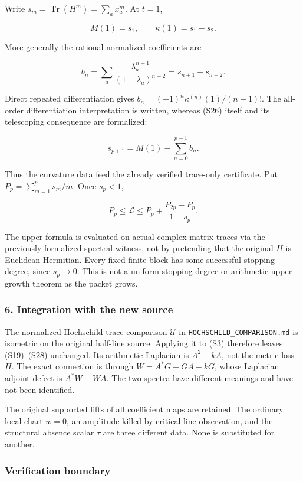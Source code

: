 Write \(s_m=\operatorname{Tr}(H^m)=\sum_a x_a^m\). At \(t=1\),

\[
M(1)=s_1,\qquad \kappa(1)=s_1-s_2.
\tag{S25}
\]

More generally the rational normalized coefficients are

\[
b_n=\sum_a\frac{\lambda_a^{n+1}}{(1+\lambda_a)^{n+2}}
=s_{n+1}-s_{n+2}.
\tag{S26}
\]

Direct repeated differentiation gives \(b_n=(-1)^n\kappa^{(n)}(1)/(n+1)!\). The all-order differentiation interpretation is written, whereas (S26) itself and its telescoping consequence are formalized:

\[
\boxed{s_{p+1}=M(1)-\sum_{n=0}^{p-1}b_n.}
\tag{S27}
\]

Thus the curvature data feed the already verified trace-only certificate. Put \(P_p=\sum_{m=1}^p s_m/m\). Once \(s_p<1\),

\[
\boxed{P_p\le\mathcal L\le P_p+\frac{P_{2p}-P_p}{1-s_p}.}
\tag{S28}
\]

The upper formula is evaluated on actual complex matrix traces via the previously formalized spectral witness, not by pretending that the original \(H\) is Euclidean Hermitian. Every fixed finite block has some successful stopping degree, since \(s_p\to0\). This is not a uniform stopping-degree or arithmetic upper-growth theorem as the packet grows.

\subsubsection{6. Integration with the new source}\label{endpoint-cc_specialization--integration-with-the-new-source}

The normalized Hochschild trace comparison \(\mathcal U\) in \nolinkurl{HOCHSCHILD_COMPARISON.md} is isometric on the original half-line source. Applying it to (S3) therefore leaves (S19)--(S28) unchanged. Its arithmetic Laplacian is \(A^2-kA\), not the metric loss \(H\). The exact connection is through \(W=A^*G+GA-kG\), whose Laplacian adjoint defect is \(A^*W-WA\). The two spectra have different meanings and have not been identified.

The original supported lifts of all coefficient maps are retained. The ordinary local chart \(w=0\), an amplitude killed by critical-line observation, and the structural absence scalar \(\tau\) are three different data. None is substituted for another.

\subsubsection{Verification boundary}\label{endpoint-cc_specialization--verification-boundary}

